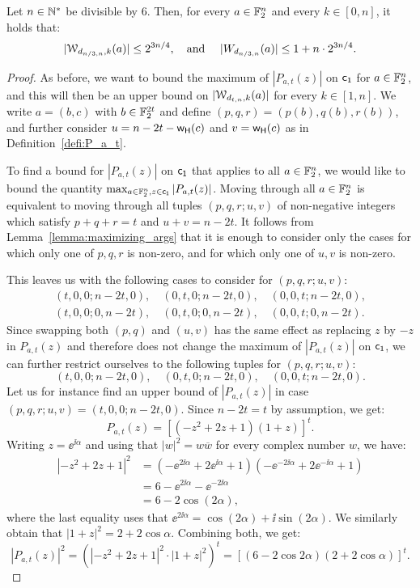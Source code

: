 \documentclass[11pt]{llncs}
\begin{document}
\begin{proposition}\label{proposition:walsh_t_over_3}
    Let $n\in\mathbb{N}^*$ be divisible by $6$. 
    Then, for every $a\in\mathbb{F}_2^n$ and every $k\in[0,n]$, it holds that:
    \[
        |\mathcal{W}_{d_{n/3,n},k}(a)|\leq2^{3n/4},\quad \text{and }\quad|W_{d_{n/3,n}}(a)|\leq 1+n\cdot 2^{3n/4}.
    \]
\end{proposition}

\begin{proof}
    As before, we want to bound the maximum of $|P_{a,t}(z)|$ on $\mathsf{c_1}$ for $a\in\mathbb{F}_2^n$, and this will then be an upper bound on $|\mathcal{W}_{d_{t,n},k}(a)|$ for every $k\in[1,n]$. 
    We write $a=(b,c)$ with $b\in\mathbb{F}_2^{2t}$ and define $(p,q,r)=(p(b),q(b),r(b))$, and further consider $u=n-2t-\mathsf{w_H}(c)$ and $v=\mathsf{w_H}(c)$ as in Definition~\ref{defi:P_a_t}. 
    
   To find a bound for $|P_{a,t}(z)|$ on $\mathsf{c_1}$ that applies to all $a\in\mathbb{F}_2^n$, we would like to bound the quantity $\max_{a\in\mathbb{F}_2^n,z\in\mathsf{c_1}}|P_{a,t}(z)|$. Moving through all $a\in\mathbb{F}_2^n$ is equivalent to moving through all tuples $(p,q,r;u,v)$ of non-negative integers which satisfy $p+q+r=t$ and $u+v=n-2t$. It follows from Lemma~\ref{lemma:maximizing_args} that it is enough to consider only the cases for which only one of $p,q,r$ is non-zero, and for which only one of $u,v$ is non-zero. 
   


   This leaves us with the following cases to consider for $(p,q,r;u,v)$:
    \begin{gather*}
        (t,0,0;n-2t,0),\quad(0,t,0;n-2t,0),\quad(0,0,t;n-2t,0),\\
         (t,0,0;0,n-2t),\quad(0,t,0;0,n-2t),\quad(0,0,t;0,n-2t).
    \end{gather*}
    Since swapping both $(p,q)$ and $(u,v)$ has the same effect as replacing $z$ by $-z$ in $P_{a,t}(z)$ and therefore does not change the maximum of $|P_{a,t}(z)|$ on $\mathsf{c_1}$, we can further restrict ourselves to the following tuples for $(p,q,r;u,v)$:
    \[
        (t,0,0;n-2t,0),\quad(0,t,0;n-2t,0),\quad(0,0,t;n-2t,0).
    \]
    Let us for instance find an upper bound of $|P_{a,t}(z)|$ in case $(p,q,r;u,v)=(t,0,0;n-2t,0)$. Since $n-2t=t$ by assumption, we get:
    \[
        P_{a,t}(z)=[(-z^2+2z+1)(1+z)]^t.
    \]
    Writing $z=\ee^{\ii\alpha}$ and using that $|w|^2=w\overline w$ for every complex number $w$, we have:
    \begin{align*}
        |-z^2+2z+1|^2&=\left(-\ee^{2\ii\alpha}+2\ee^{\ii\alpha}+1\right)\left(-\ee^{-2\ii\alpha}+2\ee^{-\ii\alpha}+1\right)\\
        &=6-\ee^{2\ii\alpha}-\ee^{-2\ii\alpha}\\
        &=6-2\cos (2\alpha),
    \end{align*}
    where the last equality uses that $\ee^{2\ii\alpha}=\cos(2\alpha)+\ii\sin(2\alpha)$. We similarly obtain that $|1+z|^2=2+2\cos\alpha$. Combining both, we get:   
    \[
        |P_{a,t}(z)|^2=\left(|-z^2+2z+1|^2\cdot|1+z|^2\right)^t=[(6-2\cos2\alpha)(2+2\cos\alpha)]^t.
    \]    


\end{proof}
\end{document}
